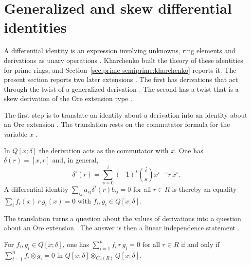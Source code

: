 \section{Generalized and skew differential identities}\label{sec:generalized-twisted:differential-identities}

A differential identity is an expression involving unknowns, ring elements and
derivations as unary operations \cite[p.~155]{Kharchenko1978}. Kharchenko
built the theory of these identities for prime rings, and
Section~\ref{sec:prime-semiprime:kharchenko} reports it. The present section
reports two later extensions \cite[p.~2838]{Chuang2017Auto}. The first has
derivations that act through the twist of a generalized derivation
\cite[p.~885]{DeFilippisFosner2012}. The second has a twist that is a skew
derivation of the Ore extension type \cite[p.~2838]{Chuang2017Auto}.

The first step is to translate an identity about a derivation into an identity
about an Ore extension \cite[p.~172]{ChuangLee2010Higher}. The translation
rests on the commutator formula for the variable $x$
\cite[p.~172]{ChuangLee2010Higher}.

\begin{remark}\label{rem:gen:identity-translate}
In $Q[x;\delta]$ the derivation acts as the commutator with $x$. One has
$\delta(r)=[x,r]$ and, in general,
\begin{equation*}
\delta^{i}(r)=\sum_{s=0}^{i}(-1)^{s}\binom{i}{s}x^{i-s}r\,x^{s}.
\end{equation*}
A differential identity $\sum_{ij}a_{ij}\delta^{i}(r)b_{ij}=0$ for all $r\in R$
is thereby an equality $\sum_{i}f_{i}(x)\,r\,g_{i}(x)=0$ with $f_{i},g_{i}\in
Q[x;\delta]$.
\end{remark}

The translation turns a question about the values of derivations into a
question about an Ore extension \cite[p.~172]{ChuangLee2010Higher}. The answer
is then a linear independence statement
\cite[Theorem~11, p.~173]{ChuangLee2010Higher}.

\begin{theorem}\label{thm:gen:identity-independence}
For $f_{i},g_{i}\in Q[x;\delta]$, one has $\sum_{i=1}^{n}f_{i}\,r\,g_{i}=0$ for
all $r\in R$ if and only if $\sum_{i=1}^{n}f_{i}\otimes g_{i}=0$ in
$Q[x;\delta]\otimes_{C_{S}(R)}Q[x;\delta]$.
\end{theorem}

